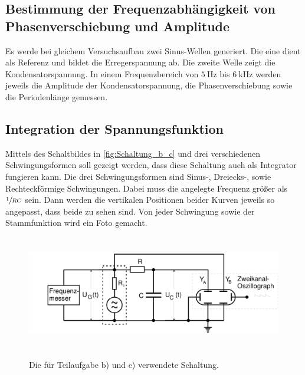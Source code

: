 \subsection{Bestimmung der Frequenzabhängigkeit von Phasenverschiebung und Amplitude}
Es werde bei gleichem Versuchsaufbau zwei Sinus-Wellen generiert. Die eine dient als Referenz
und bildet die Erregerspannung ab. Die zweite Welle zeigt die Kondensatorspannung.  
In einem Frequenzbereich von $\qty{5}{\hertz}$ bis $\qty{6}{\kilo\hertz}$ werden jeweils
die Amplitude der Kondensatorspannung, die Phasenverschiebung sowie die Periodenlänge
gemessen.
\subsection{Integration der Spannungsfunktion}
Mittels des Schaltbildes in \autoref{fig:Schaltung_b_c} und drei verschiedenen 
Schwingungsformen soll gezeigt werden, dass diese Schaltung auch als Integrator fungieren 
kann. Die drei Schwingungsformen sind Sinus-, Dreiecks-, sowie Rechteckförmige Schwingungen.
Dabei muss die angelegte Frequenz größer als $\sfrac{1}{RC}$ sein. Dann werden die vertikalen 
Positionen beider Kurven jeweils so angepasst, dass beide zu sehen sind. Von jeder Schwingung 
sowie der Stammfunktion wird ein Foto gemacht.
\begin{figure}
    \centering
    \includegraphics[height=5cm]{messdaten/Schaltung_b_c.png}
    \label{fig:Schaltung_b_c}
    \caption{Die für Teilaufgabe b) und c) verwendete Schaltung.}
\end{figure}